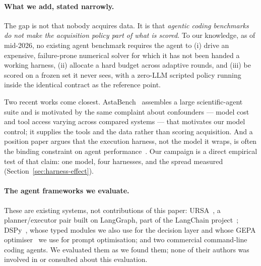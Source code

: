 \paragraph{What we add, stated narrowly.}
The gap is not that nobody acquires data. It is that \emph{agentic coding
benchmarks do not make the acquisition policy part of what is scored}. To our
knowledge, as of mid-2026, no existing agent benchmark requires the agent to
(i) drive an expensive, failure-prone numerical solver for which it has not been
handed a working harness, (ii) allocate a hard budget across adaptive rounds,
and (iii) be scored on a frozen set it never sees, with a zero-LLM scripted
policy running inside the identical contract as the reference point.

Two recent works come closest. AstaBench~\citep{bragg2025astabench} assembles a
large scientific-agent suite and is motivated by the same complaint about
confounders --- model cost and tool access varying across compared systems ---
that motivates our model control; it supplies the tools and the data rather than
scoring acquisition. And a position paper argues that the execution harness,
not the model it wraps, is often the binding constraint on agent
performance~\citep{zhang2026harness}. Our campaign is a direct empirical test of
that claim: one model, four harnesses, and the spread measured
(Section~\ref{sec:harness-effect}).

\paragraph{The agent frameworks we evaluate.}
These are existing systems, not contributions of this paper:
URSA~\citep{ursa2025}, a planner/executor pair built on LangGraph, part of the
LangChain project~\citep{langchain2022}; DSPy~\citep{khattab2024dspy}, whose
typed modules we also use for the \Lone{} decision layer and whose GEPA
optimiser~\citep{agrawal2025gepa} we use for prompt optimisation; and two
commercial command-line coding agents. We evaluated them as we found them; none
of their authors was involved in or consulted about this evaluation.
